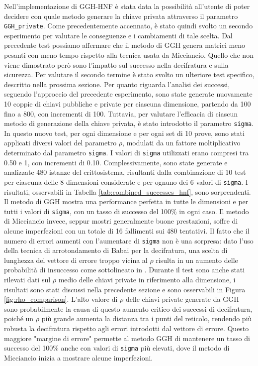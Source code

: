 Nell'implementazione di GGH-HNF è stata data la possibilità all'utente di poter decidere
con quale metodo generare la chiave privata attraverso il parametro \texttt{GGH\_private}.
Come precedentemente accennato, è stato quindi svolto un secondo esperimento per valutare 
le conseguenze e i cambiamenti di tale scelta. Dal precedente test possiamo affermare
che il metodo di GGH genera matrici meno pesanti con meno tempo rispetto alla tecnica
usata da Micciancio. Quello che non viene dimostrato però sono l'impatto sul successo
nella decifratura e sulla sicurezza. Per valutare il secondo termine è stato svolto un ulteriore 
test specifico, descritto nella prossima sezione. 
Per quanto riguarda l'analisi dei successi, seguendo l'approccio del precedente esperimento,
sono state generate nuovamente 10 
coppie di chiavi pubbliche e private per ciascuna dimensione, 
partendo da 100 fino a 800, con incrementi di 100.
Tuttavia, per valutare l'efficacia di ciascun metodo di generazione della chiave privata, 
è stato introdotto il parametro \texttt{sigma}.
In questo nuovo test, per ogni dimensione e per ogni set di 10 
prove, sono stati applicati diversi valori del parametro $\rho$, modulati da un fattore 
moltiplicativo determinato dal parametro \texttt{sigma}. 
I valori di \texttt{sigma} utilizzati erano compresi tra 0.50 e 1, con incrementi di 0.10. 
Complessivamente, sono state generate e analizzate 480 istanze del crittosistema, 
risultanti dalla combinazione di 10 test per ciascuna delle 8 dimensioni considerate e 
per ognuno dei 6 valori di \texttt{sigma}.
I risultati, osservabili in Tabella \ref{tab:combined_successes_hnf}, sono sorprendenti. 
Il metodo di GGH mostra una performance perfetta in tutte le dimensioni e per tutti i valori 
di \texttt{sigma}, con un tasso di successo del 100\% in ogni caso. Il metodo di 
Micciancio invece, seppur mostri generalmente buone prestazioni, soffre di alcune 
imperfezioni con un totale di 16 fallimenti sui 480 tentativi. Il fatto che il numero di errori
aumenti con l'aumentare di \texttt{sigma} non è una sorpresa: dato l'uso della
tecnica di arrotondamento di Babai per la decifratura, una scelta di lunghezza del 
vettore di errore troppo vicina al $\rho$ risulta in un aumento delle probabilità di insuccesso 
come sottolineato in \cite[Sezione 3.1]{HNF04}. 
Durante il test sono anche stati rilevati dati sul $\rho$ medio delle chiavi private 
in riferimento alla dimensione, i risultati sono stati discussi nella precedente sezione e 
sono osservabili in Figura \ref{fig:rho_comparison}. 
L'alto valore di $\rho$ delle chiavi private generate da GGH sono probabilmente la causa 
di questo aumento critico dei successi di decifratura, poiché un $\rho$ più grande aumenta 
la distanza tra i punti del reticolo, rendendo più robusta la decifratura rispetto agli 
errori introdotti dal vettore di errore. Questo maggiore "margine di errore" permette 
al metodo GGH di mantenere un tasso di successo del 100\% anche con valori di \texttt{sigma} 
più elevati, dove il metodo di Micciancio inizia a mostrare alcune imperfezioni. 



